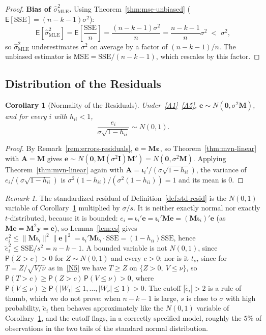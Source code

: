 \documentclass[14pt]{extarticle}
\theoremstyle{plain}
\newtheorem{corollary}[theorem]{Corollary}
\theoremstyle{definition}
\theoremstyle{remark}
\newtheorem{remark}[theorem]{Remark}
\newcommand\expc{\mathsf{E}}
\newcommand\prb{\mathsf{P}}
\newcommand{\SSE}{\mathrm{SSE}}
\newcommand{\MSE}{\mathrm{MSE}}
\newcommand{\by}{\mathbf{y}}
\newcommand{\be}{\boldsymbol{\varepsilon}}
\newcommand{\bI}{\mathbf{I}}
\newcommand{\bM}{\mathbf{M}}
\newcommand{\bzero}{\mathbf{0}}
\newcommand{\bA}{\mathbf{A}}
\begin{document}
\begin{proof}
\textbf{Bias of $\hat{\sigma}^2_{\mathrm{MLE}}$.} Using Theorem~\ref{thm:mse-unbiased} ($\expc[\SSE] = (n-k-1)\sigma^2$):
\[
\expc[\hat{\sigma}^2_{\mathrm{MLE}}] = \expc\!\left[\frac{\SSE}{n}\right] = \frac{(n-k-1)\sigma^2}{n} = \frac{n-k-1}{n}\sigma^2 \;<\; \sigma^2,
\]
so $\hat{\sigma}^2_{\mathrm{MLE}}$ underestimates $\sigma^2$ on average by a factor of $(n-k-1)/n$. The unbiased estimator is $\MSE = \SSE/(n-k-1)$, which rescales by this factor.
\end{proof}

\subsection{Distribution of the Residuals}

\begin{corollary}[Normality of the Residuals]\label{cor:resid-normal}
Under~\ref{A1}--\ref{A5}, $\mathbf{e} \sim N(\bzero, \sigma^2\bM)$, and for every $i$ with $h_{ii} < 1$,
\[
\frac{e_i}{\sigma\sqrt{1 - h_{ii}}} \sim N(0, 1).
\]
\end{corollary}

\begin{proof}
By Remark~\ref{rem:errors-residuals}, $\mathbf{e} = \bM\be$, so Theorem~\ref{thm:mvn-linear} with $\bA = \bM$ gives $\mathbf{e} \sim N(\bzero, \bM(\sigma^2\bI)\bM') = N(\bzero, \sigma^2\bM)$. Applying Theorem~\ref{thm:mvn-linear} again with $\bA = \boldsymbol\iota_i'/(\sigma\sqrt{1 - h_{ii}})$, the variance of $e_i/(\sigma\sqrt{1 - h_{ii}})$ is $\sigma^2(1 - h_{ii})/(\sigma^2(1 - h_{ii})) = 1$ and its mean is $0$.
\end{proof}

\begin{remark}\label{rem:std-resid-law}
The standardized residual of Definition~\ref{def:std-resid} is the $N(0,1)$ variable of Corollary~\ref{cor:resid-normal} multiplied by $\sigma/s$. It is neither exactly normal nor exactly $t$-distributed, because it is bounded: $e_i = \boldsymbol\iota_i'\mathbf{e} = \boldsymbol\iota_i'\bM\mathbf{e} = (\bM\boldsymbol\iota_i)'\mathbf{e}$ (as $\bM\mathbf{e} = \bM^2\by = \mathbf{e}$), so Lemma~\ref{lem:cs} gives $e_i^2 \leqslant \|\bM\boldsymbol\iota_i\|^2\|\mathbf{e}\|^2 = \boldsymbol\iota_i'\bM\boldsymbol\iota_i \cdot \SSE = (1 - h_{ii})\SSE$, hence $\tilde e_i^2 \leqslant \SSE/s^2 = n - k - 1$. A bounded variable is not $N(0,1)$, since $\prb(Z > c) > 0$ for $Z \sim N(0,1)$ and every $c > 0$; nor is it $t_\nu$, since for $T = Z/\sqrt{V/\nu}$ as in~\ref{N5} we have $T \geqslant Z$ on $\{Z > 0,\ V \leqslant \nu\}$, so $\prb(T > c) \geqslant \prb(Z > c)\,\prb(V \leqslant \nu) > 0$, where $\prb(V \leqslant \nu) \geqslant \prb(|W_1| \leqslant 1, \ldots, |W_\nu| \leqslant 1) > 0$. The cutoff $|\tilde e_i| > 2$ is a rule of thumb, which we do not prove: when $n - k - 1$ is large, $s$ is close to $\sigma$ with high probability, $\tilde e_i$ then behaves approximately like the $N(0,1)$ variable of Corollary~\ref{cor:resid-normal}, and the cutoff flags, in a correctly specified model, roughly the $5\%$ of observations in the two tails of the standard normal distribution.
\end{remark}
\end{document}

